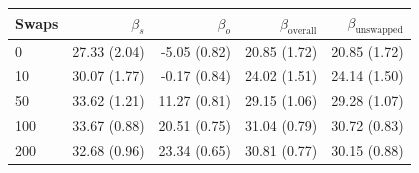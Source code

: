 \begin{table}[H]
\begin{tabular}{l rrrr}
\toprule
Swaps & $\beta_s$ & $\beta_o$ & $\beta_{\mathrm{overall}}$ & $\beta_{\mathrm{unswapped}}$ \\
\midrule
0 & 27.33 (2.04) & -5.05 (0.82) & 20.85 (1.72) & 20.85 (1.72) \\
10 & 30.07 (1.77) & -0.17 (0.84) & 24.02 (1.51) & 24.14 (1.50) \\
50 & 33.62 (1.21) & 11.27 (0.81) & 29.15 (1.06) & 29.28 (1.07) \\
100 & 33.67 (0.88) & 20.51 (0.75) & 31.04 (0.79) & 30.72 (0.83) \\
200 & 32.68 (0.96) & 23.34 (0.65) & 30.81 (0.77) & 30.15 (0.88) \\
\bottomrule
\end{tabular}
\end{table}

